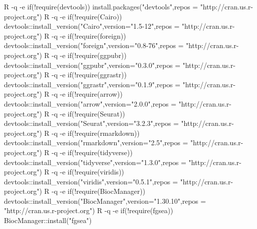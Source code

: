 \documentclass[
]{article}
\newenvironment{Shaded}{\begin{snugshade}}{\end{snugshade}}
\newcommand{\AttributeTok}[1]{\textcolor[rgb]{0.77,0.63,0.00}{#1}}
\newcommand{\ExtensionTok}[1]{#1}
\newcommand{\StringTok}[1]{\textcolor[rgb]{0.31,0.60,0.02}{#1}}
\begin{document}
\begin{Shaded}
\begin{Highlighting}[]
\ExtensionTok{R} \AttributeTok{{-}q} \AttributeTok{{-}e} \StringTok{\textquotesingle{}if(!require(devtools)) install.packages("devtools",repos = "http://cran.us.r{-}project.org")\textquotesingle{}}
\ExtensionTok{R} \AttributeTok{{-}q} \AttributeTok{{-}e} \StringTok{\textquotesingle{}if(!require(Cairo)) devtools::install\_version("Cairo",version="1.5{-}12",repos = "http://cran.us.r{-}project.org")\textquotesingle{}}
\ExtensionTok{R} \AttributeTok{{-}q} \AttributeTok{{-}e} \StringTok{\textquotesingle{}if(!require(foreign)) devtools::install\_version("foreign",version="0.8{-}76",repos = "http://cran.us.r{-}project.org")\textquotesingle{}}
\ExtensionTok{R} \AttributeTok{{-}q} \AttributeTok{{-}e} \StringTok{\textquotesingle{}if(!require(ggpubr)) devtools::install\_version("ggpubr",version="0.3.0",repos = "http://cran.us.r{-}project.org")\textquotesingle{}}
\ExtensionTok{R} \AttributeTok{{-}q} \AttributeTok{{-}e} \StringTok{\textquotesingle{}if(!require(ggrastr)) devtools::install\_version("ggrastr",version="0.1.9",repos = "http://cran.us.r{-}project.org")\textquotesingle{}}
\ExtensionTok{R} \AttributeTok{{-}q} \AttributeTok{{-}e} \StringTok{\textquotesingle{}if(!require(arrow)) devtools::install\_version("arrow",version="2.0.0",repos = "http://cran.us.r{-}project.org")\textquotesingle{}}
\ExtensionTok{R} \AttributeTok{{-}q} \AttributeTok{{-}e} \StringTok{\textquotesingle{}if(!require(Seurat)) devtools::install\_version("Seurat",version="3.2.3",repos = "http://cran.us.r{-}project.org")\textquotesingle{}}
\ExtensionTok{R} \AttributeTok{{-}q} \AttributeTok{{-}e} \StringTok{\textquotesingle{}if(!require(rmarkdown)) devtools::install\_version("rmarkdown",version="2.5",repos = "http://cran.us.r{-}project.org")\textquotesingle{}}
\ExtensionTok{R} \AttributeTok{{-}q} \AttributeTok{{-}e} \StringTok{\textquotesingle{}if(!require(tidyverse)) devtools::install\_version("tidyverse",version="1.3.0",repos = "http://cran.us.r{-}project.org")\textquotesingle{}}
\ExtensionTok{R} \AttributeTok{{-}q} \AttributeTok{{-}e} \StringTok{\textquotesingle{}if(!require(viridis)) devtools::install\_version("viridis",version="0.5.1",repos = "http://cran.us.r{-}project.org")\textquotesingle{}}
\ExtensionTok{R} \AttributeTok{{-}q} \AttributeTok{{-}e} \StringTok{\textquotesingle{}if(!require(BiocManager)) devtools::install\_version("BiocManager",version="1.30.10",repos = "http://cran.us.r{-}project.org")\textquotesingle{}}
\ExtensionTok{R} \AttributeTok{{-}q} \AttributeTok{{-}e} \StringTok{\textquotesingle{}if(!require(fgsea)) BiocManager::install("fgsea")\textquotesingle{}}


\end{Highlighting}
\end{Shaded}
\end{document}
